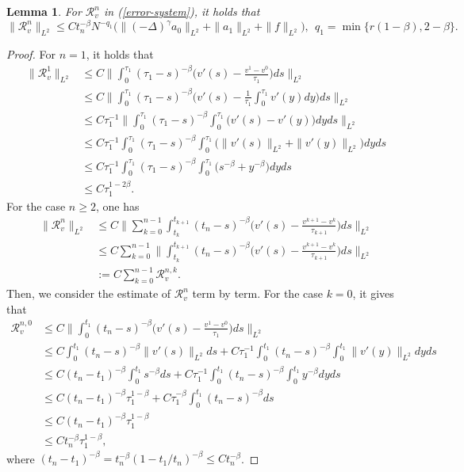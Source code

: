 \documentclass[11pt]{article}
\newtheorem{lemma}{Lemma}[section]
\numberwithin{equation}{section}
\begin{document}
\begin{lemma}\label{lem-r-1}
For $\mathcal{R}_v^n$ in (\ref{error-system}), it holds that
\[
\|\mathcal{R}_v^n\|_{L^2} \le Ct_n^{-\beta}N^{-q_1}\Big(\|(-\Delta)^{\gamma}a_0\|_{L^2}+\|a_1\|_{L^2}+\|f\|_{L^2}\Big),~~q_1=\min\{r(1-\beta),2-\beta\}.
\]
\end{lemma}
\begin{proof}
For $n=1$, it holds that
\begin{align*}
\|\mathcal{R}_v^1\|_{L^2}
&\le C\bigg\|\int_0^{\tau_1}(\tau_1-s)^{-\beta}\bigg(v'(s)-\frac{v^1-v^0}{\tau_1}\bigg)ds\bigg\|_{L^2}\\
&\le C\bigg\|\int_0^{\tau_1}(\tau_1-s)^{-\beta}\bigg(v'(s)-\frac{1}{\tau_1}\int_0^{\tau_1}v'(y)dy\bigg)ds\bigg\|_{L^2}\\
&\le C\tau_1^{-1}\bigg\|\int_0^{\tau_1}(\tau_1-s)^{-\beta}\int_0^{\tau_1}\big(v'(s)-v'(y)\big)dyds\bigg\|_{L^2}\\
&\le C\tau_1^{-1}\int_0^{\tau_1}(\tau_1-s)^{-\beta}\int_0^{\tau_1}\big(\|v'(s)\|_{L^2}+\|v'(y)\|_{L^2}\big)dyds\\
&\le C\tau_1^{-1}\int_0^{\tau_1}(\tau_1-s)^{-\beta}\int_0^{\tau_1}\big(s^{-\beta}+y^{-\beta}\big)dyds\\
&\le C\tau_1^{1-2\beta}.
\end{align*}
For the case $n\geq2$, one has
\begin{align*}
\|\mathcal{R}_v^n\|_{L^2}
&\le C\bigg\|\sum_{k=0}^{n-1}\int_{t_k}^{t_{k+1}}(t_n-s)^{-\beta}\bigg(v'(s)-\frac{v^{k+1}-v^k}{\tau_{k+1}}\bigg)ds\bigg\|_{L^2}\\
&\le C\sum_{k=0}^{n-1}\bigg\|\int_{t_k}^{t_{k+1}}(t_n-s)^{-\beta}\bigg(v'(s)-\frac{v^{k+1}-v^k}{\tau_{k+1}}\bigg)ds\bigg\|_{L^2}\\
&:=C\sum_{k=0}^{n-1}\mathcal{R}_v^{n,k}.
\end{align*}
Then, we consider the estimate of $\mathcal{R}_v^n$ term by term. For the case $k=0$, it gives that
\begin{align*}
\mathcal{R}_v^{n,0}
&\le C\bigg\|\int_{0}^{t_1}(t_n-s)^{-\beta}\bigg(v'(s)-\frac{v^1-v^0}{\tau_1}\bigg)ds\bigg\|_{L^2}\\
&\le C\int_{0}^{t_1}(t_n-s)^{-\beta}\|v'(s)\|_{L^2}ds+C\tau_1^{-1}\int_0^{t_1}(t_n-s)^{-\beta}\int_0^{t_1}\|v'(y)\|_{L^2}dyds\\
&\le C(t_n-t_1)^{-\beta}\int_0^{t_1}s^{-\beta}ds+C\tau_1^{-1}\int_0^{t_1}(t_n-s)^{-\beta}\int_0^{t_1}y^{-\beta}dyds\\
&\le C(t_n-t_1)^{-\beta}\tau_1^{1-\beta}+C\tau_1^{-\beta}\int_0^{t_1}(t_n-s)^{-\beta}ds\\
&\le C(t_n-t_1)^{-\beta}\tau_1^{1-\beta}\\
&\le Ct_n^{-\beta}\tau_1^{1-\beta},
\end{align*}
where $(t_n-t_1)^{-\beta}=t_n^{-\beta}(1-t_1/t_n)^{-\beta}\le Ct_n^{-\beta}$.


\end{proof}
\end{document}
